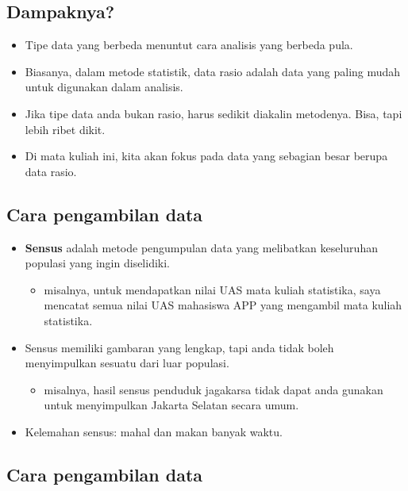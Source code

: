 \documentclass[
  letterpaper,
  DIV=11,
  numbers=noendperiod]{scrartcl}
\providecommand{\tightlist}{%
  \setlength{\itemsep}{0pt}\setlength{\parskip}{0pt}}\usepackage{longtable,booktabs,array}
\begin{document}
\subsection{Dampaknya?}\label{dampaknya}

\begin{itemize}
\item
  Tipe data yang berbeda menuntut cara analisis yang berbeda pula.
\item
  Biasanya, dalam metode statistik, data rasio adalah data yang paling
  mudah untuk digunakan dalam analisis.
\item
  Jika tipe data anda bukan rasio, harus sedikit diakalin metodenya.
  Bisa, tapi lebih ribet dikit.
\item
  Di mata kuliah ini, kita akan fokus pada data yang sebagian besar
  berupa data rasio.
\end{itemize}

\subsection{Cara pengambilan data}\label{cara-pengambilan-data}

\begin{itemize}
\item
  \textbf{Sensus} adalah metode pengumpulan data yang melibatkan
  keseluruhan populasi yang ingin diselidiki.

  \begin{itemize}
  \tightlist
  \item
    misalnya, untuk mendapatkan nilai UAS mata kuliah statistika, saya
    mencatat semua nilai UAS mahasiswa APP yang mengambil mata kuliah
    statistika.
  \end{itemize}
\item
  Sensus memiliki gambaran yang lengkap, tapi anda tidak boleh
  menyimpulkan sesuatu dari luar populasi.

  \begin{itemize}
  \tightlist
  \item
    misalnya, hasil sensus penduduk jagakarsa tidak dapat anda gunakan
    untuk menyimpulkan Jakarta Selatan secara umum.
  \end{itemize}
\item
  Kelemahan sensus: mahal dan makan banyak waktu.
\end{itemize}

\subsection{Cara pengambilan data}\label{cara-pengambilan-data-1}
\end{document}
